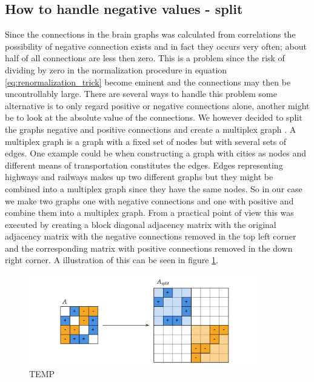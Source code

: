 \subsection{How to handle negative values - split}
Since the connections in the brain graphs was calculated from correlations the possibility of negative connection exists and in fact they occurs very often; about half of all connections are less then zero. This is a problem since the risk of dividing by zero in the normalization procedure in equation \eqref{eq:renormalization_trick} become eminent and the connections may then be uncontrollably large. There are several ways to handle this problem some alternative is to only regard positive or negative connections alone, another might be to look at the absolute value of the connections. We however decided to split the graphs negative and positive connections and create a multiplex graph \cite{}. A multiplex graph is a graph with a fixed set of nodes but with several sets of edges. One example could be when constructing a graph with cities as nodes and different means of transportation constitutes the edges. Edges representing highways and railways makes up two different graphs but they might be combined into a multiplex graph since they have the same nodes. So in our case we make two graphs one with negative connections and one with positive and combine them into a multiplex graph. From a practical point of view this was executed by creating a block diagonal adjacency matrix with the original adjacency matrix with the negative connections removed in the top left corner and the corresponding matrix with positive connections removed in the down right corner. A illustration of this can be seen in figure \ref{fig:block_diagonal_adjacency_matrix}.

\begin{figure}[H]
    \centering
    \includegraphics[width=0.9\textwidth]{chapters/images_methods/split.png}
    \caption{TEMP}
    \label{fig:block_diagonal_adjacency_matrix}
\end{figure}

